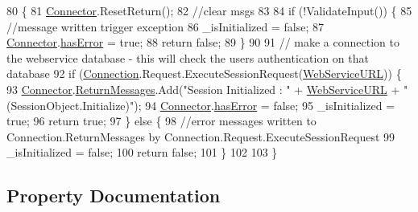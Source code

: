 \begin{DoxyCode}
80                              \{
81         \mbox{\hyperlink{class_connector}{Connector}}.ResetReturn();
82         \textcolor{comment}{//clear msgs}
83 
84         \textcolor{keywordflow}{if} (!ValidateInput()) \{
85             \textcolor{comment}{//message written trigger exception}
86             \_isInitialized = \textcolor{keyword}{false};
87             \mbox{\hyperlink{class_connector}{Connector}}.\mbox{\hyperlink{class_connector_a079bae21a5417efa53bfe8954c0f533f}{hasError}} = \textcolor{keyword}{true};
88             \textcolor{keywordflow}{return} \textcolor{keyword}{false};
89         \}
90 
91         \textcolor{comment}{// make a connection to the webservice database - this will check the users authentication on that
       database}
92         \textcolor{keywordflow}{if} (\mbox{\hyperlink{class_session_object_a014bdbf705a753540e19bfb53030c55c}{Connection}}.Request.ExecuteSessionRequest(\mbox{\hyperlink{class_session_object_a697c071c812fbf7ad1166b896fb44c16}{WebServiceURL}})) \{
93             \mbox{\hyperlink{class_connector}{Connector}}.\mbox{\hyperlink{class_connector_a1ed422674b344524fd77998dcf6a9ba6}{ReturnMessages}}.Add(\textcolor{stringliteral}{"Session Initialized : "} + 
      \mbox{\hyperlink{class_session_object_a697c071c812fbf7ad1166b896fb44c16}{WebServiceURL}} + \textcolor{stringliteral}{" (SessionObject.Initialize)"});
94             \mbox{\hyperlink{class_connector}{Connector}}.\mbox{\hyperlink{class_connector_a079bae21a5417efa53bfe8954c0f533f}{hasError}} = \textcolor{keyword}{false};
95             \_isInitialized = \textcolor{keyword}{true};
96             \textcolor{keywordflow}{return} \textcolor{keyword}{true};
97         \} \textcolor{keywordflow}{else} \{
98             \textcolor{comment}{//error messages written to Connection.ReturnMessages by
       Connection.Request.ExecuteSessionRequest}
99             \_isInitialized = \textcolor{keyword}{false};
100             \textcolor{keywordflow}{return} \textcolor{keyword}{false};
101         \}
102 
103     \}
\end{DoxyCode}


\subsection{Property Documentation}
\mbox{\label{class_session_object_a014bdbf705a753540e19bfb53030c55c}} 
